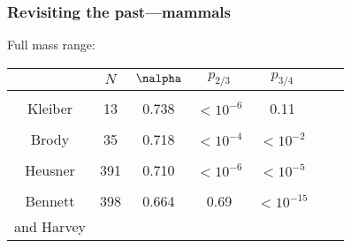 \begin{frame}
  \frametitle{Revisiting the past---mammals}

    Full mass range:

    \begin{tabular}{ccccccc}
             & $N$ & $\nalpha$ & $p_{2/3}$ & $p_{3/4}$ \\ \hline
              & & & & & & \\
      Kleiber             &  13 & 0.738 & $<10^{-6}$ & 0.11 \\
              & & & & & & \\
      Brody               &  35 & 0.718 & $<10^{-4}$ & $<10^{-2}$ \\
              & & & & & & \\
      Heusner             & 391 & 0.710 & $<10^{-6}$ & $<10^{-5}$ \\
              & & & & & & \\
      Bennett   & 398 & 0.664 & 0.69 &     $<10^{-15}$ \\
      and Harvey & & & & & & \\
    \end{tabular}

\end{frame}

